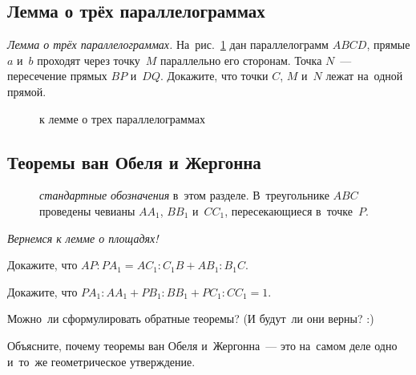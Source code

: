 \subsection*{Лемма о трёх параллелограммах}

\begin{problems}

\item
\label{triangle-area-3:problem:parallelogramm}%
\textit{Лемма о трёх параллелограммах.}
На~рис.~\ref{triangle-area-3:problem:parallelogramm:fig}
дан параллелограмм $ABCD$, прямые $a$ и~$b$ проходят через точку~$M$
параллельно его сторонам.
Точка $N$~--- пересечение прямых $BP$ и~$DQ$.
Докажите, что точки $C$, $M$ и~$N$ лежат на~одной прямой.

\begin{figure}[hb]
\begin{center}
    \caption{к лемме о трех параллелограммах}
    \label{triangle-area-3:problem:parallelogramm:fig}
\end{center}
\end{figure}

\end{problems}


\subsection*{Теоремы ван Обеля и Жергонна}

\begin{figure}[hb]
\begin{center}
    \caption{%
        \emph{стандартные обозначения} в~этом разделе.
        В~треугольнике $ABC$ проведены чевианы $A A_1$, $B B_1$ и~$C C_1$,
        пересекающиеся в~точке~$P$.}
    \label{triangle-area-3:fig:generic-triangle}
\end{center}
\end{figure}

\emph{Вернемся к лемме о площадях!}

\begin{problems}

\item
{}
Докажите, что $AP : P A_1 = A C_1 : C_1 B + A B_1 : B_1 C$.

\item
{}
Докажите, что $P A_1 : A A_1 + P B_1 : B B_1 + P C_1 : C C_1 = 1$.

\itemx{*}
Можно~ли сформулировать обратные теоремы?
(И будут~ли они верны? :)

\itemx{*}
Объясните, почему теоремы ван Обеля и~Жергонна~--- это на~самом деле одно
и~то~же геометрическое утверждение.

\end{problems}

